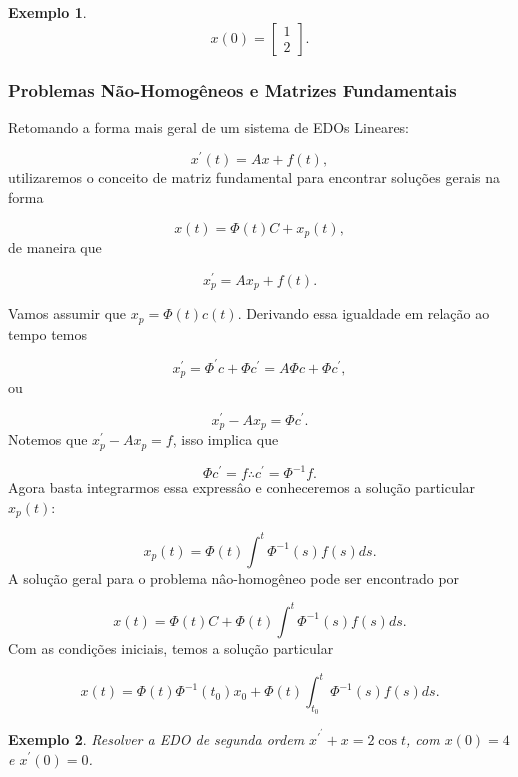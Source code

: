 \documentclass[a4paper,portuguese,9pt,final]{extarticle}
\newtheorem{example}{Exemplo}[section]
\begin{document}
\begin{multicols*}{2}
\begin{example}
            $$x(0) = \begin{bmatrix} 1 \\ 2 \end{bmatrix}.$$
            
            \end{example}
            
            \subsubsection{Problemas Não-Homogêneos e Matrizes Fundamentais}
            
            Retomando a forma mais geral de um sistema de EDOs Lineares:
            
            $$x^\prime(t) = Ax + f(t),$$ utilizaremos o conceito de matriz fundamental para encontrar soluções gerais na forma
            
            $$x(t) = \Phi (t)C + x_p (t),$$ de maneira que 
            
            $$x^\prime_p = Ax_p + f(t).$$
            
            Vamos assumir que $x_p = \Phi (t)c(t)$. Derivando essa igualdade em relação ao tempo temos
            
            $$x^\prime _p = \Phi^\prime c + \Phi c^\prime = A\Phi c + \Phi c^\prime,$$ ou
            
            $$x^\prime _p  - Ax_p = \Phi c^\prime.$$ Notemos que $x^\prime _p  - Ax_p = f$, isso implica que
            
            $$\Phi c^\prime = f \therefore c^\prime = \Phi^{-1}f.$$ Agora basta integrarmos essa expressâo e conheceremos a solução particular $x_p (t)$:
            
            $$x_p (t) = \Phi (t) \int^{t}\Phi^{-1}(s)f(s)ds.$$ A solução geral para o problema nâo-homogêneo pode ser encontrado por
            
            $$x(t) = \Phi (t)C + \Phi (t) \int^{t}\Phi^{-1}(s)f(s)ds.$$ Com as condições iniciais, temos a solução particular
            
            $$x(t) = \Phi (t)\Phi^{-1}(t_0)x_0 + \Phi (t) \int^{t}_{t_0}\Phi^{-1}(s)f(s)ds.$$
            
            \begin{example}
                Resolver a EDO de segunda ordem $x^\prime^\prime + x = 2
                \cos{t}$, com $x(0)=4$ e $x^\prime (0)=0$.
            \end{example}
            
            

\end{multicols*}
\end{document}
